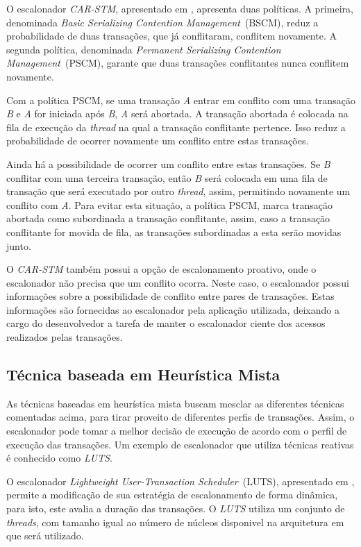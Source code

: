 \documentclass[ti]{texufpel}
\begin{document}
O escalonador \emph{CAR-STM}, apresentado em \cite{dolev08}, apresenta duas políticas. A primeira, denominada \emph{Basic Serializing Contention Management}~(BSCM), reduz a probabilidade de duas transações, que já conflitaram, conflitem novamente. A segunda política, denominada \emph{Permanent Serializing Contention Management}~(PSCM), garante que duas transações conflitantes nunca conflitem novamente.

Com a política PSCM, se uma transação \emph{A} entrar em conflito com uma transação \emph{B} e \emph{A} for iniciada após \emph{B}, \emph{A} será abortada. A transação abortada é colocada na fila de execução da \emph{thread} na qual a transação conflitante pertence. Isso reduz a probabilidade de ocorrer novamente um conflito entre estas transações.

Ainda há a possibilidade de ocorrer um conflito entre estas transações. Se \emph{B} conflitar com uma terceira transação, então \emph{B} será colocada em uma fila de transação que será executado por outro \emph{thread}, assim, permitindo novamente um conflito com \emph{A}. Para evitar esta situação, a política PSCM, marca transação abortada como subordinada a transação conflitante, assim, caso a transação conflitante for movida de fila, as transações subordinadas a esta serão movidas junto.

O \emph{CAR-STM} também possui a opção de escalonamento proativo, onde o escalonador não precisa que um conflito ocorra. Neste caso, o escalonador possui informações sobre a possibilidade de conflito entre pares de transações. Estas informações são fornecidas ao escalonador pela aplicação utilizada, deixando a cargo do desenvolvedor a tarefa de manter o escalonador ciente dos acessos realizados pelas transações.

\subsection{Técnica baseada em Heurística Mista}

As técnicas baseadas em heurística mista buscam mesclar as diferentes técnicas comentadas acima, para tirar proveito de diferentes perfis de transações. Assim, o escalonador pode tomar a melhor decisão de execução de acordo com o perfil de execução das transações.  Um exemplo de escalonador que utiliza técnicas reativas é conhecido como \emph{LUTS}.

O escalonador \emph{Lightweight User-Transaction Scheduler}~(LUTS), apresentado em \cite{nicacio13}, permite a modificação de sua estratégia de escalonamento de forma dinâmica, para isto, este avalia a duração das transações. O \emph{LUTS} utiliza um conjunto de \emph{threads}, com tamanho igual ao número de núcleos disponivel na arquitetura em que será utilizado.
\end{document}
